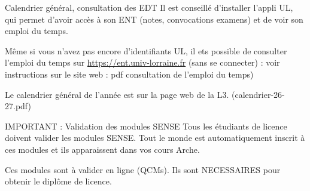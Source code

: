 \documentclass{beamer}
\begin{document}
 \begin{frame}{Calendrier général, consultation des EDT}
Il est conseillé d'installer l'appli UL, qui permet d'avoir accès à son ENT (notes, convocations examens) et de voir son emploi du temps.

Même si vous n'avez pas encore d'identifiants UL, il ets possible de consulter l'emploi du temps sur \url{https://ent.univ-lorraine.fr} (sans se connecter) : voir instructions sur le site web : pdf \og consultation de l'emploi du temps)

Le calendrier général de l'année est sur la page web de la L3. (calendrier-26-27.pdf)
\end{frame}

 \begin{frame}{IMPORTANT : Validation des modules SENSE}
Tous les étudiants de licence doivent valider les modules \og SENSE\fg. Tout le monde est automatiquement inscrit à ces modules et ils apparaissent dans vos cours Arche.

Ces modules sont à valider en ligne (QCMs). Ils sont NECESSAIRES pour obtenir le diplôme de licence.
\end{frame}
 
 
%
% 
% 
%
 
 

 
  
\end{document}
